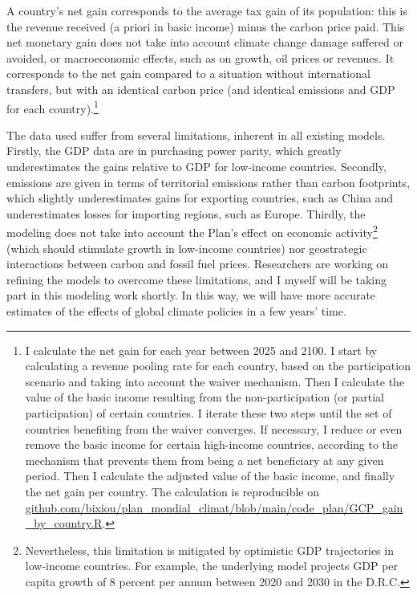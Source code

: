 \documentclass[a5paper,english,openany]{memoir}
\begin{document}
A country's net gain corresponds to the average tax gain of its population: this is the revenue received (a priori in basic income) minus the carbon price paid. This net monetary gain does not take into account climate change damage suffered or avoided, or macroeconomic effects, such as on growth, oil prices or revenues. %
It corresponds to the net gain compared to a situation without international transfers, but with an identical carbon price (and identical emissions and GDP for each country).\footnote{I calculate the net gain for each year between 2025 and 2100.   
I start by calculating a revenue pooling rate for each country, based on the participation scenario and taking into account the waiver mechanism. Then I calculate the value of the basic income resulting from the non-participation (or partial participation) of certain countries. I iterate these two steps until the set of countries benefiting %
from the waiver converges. 
If necessary, I reduce or even remove the basic income for certain high-income countries,  according to the mechanism that prevents them from being a net beneficiary at any given period. Then I calculate the adjusted value of the basic income, and finally the net gain per country. The calculation is reproducible on \href{https://github.com/bixiou/plan_mondial_climat/blob/main/code_plan/GCP_gain_by_country.R}{github.com/bixiou/plan\_mondial\_climat/blob/main/code\_plan/GCP\_gain\_by\_country.R}.}

The data used suffer from several limitations, inherent in all existing models. Firstly, the GDP data are in purchasing power parity, which greatly underestimates the gains relative to GDP for low-income countries. Secondly, emissions are given in terms of territorial emissions rather than carbon footprints, which slightly underestimates gains for exporting countries, such as China %
and underestimates losses for importing regions, such as Europe. %
Thirdly, the modeling %
does not take into account the Plan's effect on economic activity\footnote{Nevertheless, this limitation is mitigated by optimistic GDP trajectories in low-income countries. For example, the underlying model projects GDP per capita growth of 8 percent per annum between 2020 and 2030 in the D.R.C.} (which should stimulate growth in low-income countries) nor geostrategic interactions between carbon and fossil fuel prices. Researchers are working on refining the models to overcome these limitations, and I myself will be taking part in this modeling %
work shortly. In this way, we will have more accurate estimates of the effects of global climate policies in a few years' time. %
\end{document}
